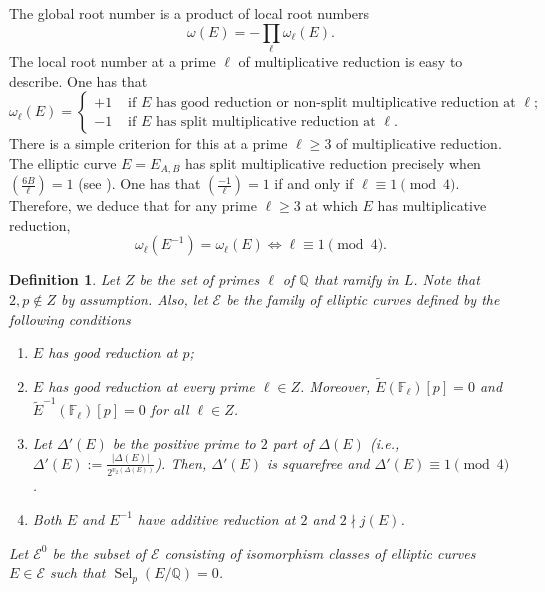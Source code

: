 \documentclass[12pt]{amsart}
\newtheorem{definition}[theorem]{Definition}
\newcommand{\cE}{\mathcal{E}}
\newcommand{\Q}{\mathbb{Q}}
\newcommand{\F}{\mathbb{F}}
\newcommand{\op}[1]{\operatorname{#1}}
\numberwithin{equation}{section}
\begin{document}
\par The global root number is a product of local root numbers 
\[\omega(E)=-\prod_\ell \omega_\ell(E).\] The local root number at a prime $\ell$ of multiplicative reduction is easy to describe. One has that 
\begin{equation}\label{local root number formula}\omega_\ell(E)=\begin{cases}
    +1 & \text{ if }E\text{ has good reduction or non-split multiplicative reduction at }\ell;\\
    -1 & \text{ if }E\text{ has split multiplicative reduction at }\ell.
\end{cases}\end{equation}
There is a simple criterion for this at a prime $\ell \ge 3$ of multiplicative reduction. The elliptic curve $E=E_{A,B}$ has split multiplicative reduction precisely when $\left(\frac{6B}{\ell}\right)=1$ (see \cite[Lemma 10]{Wong}). One has that $\left(\frac{-1}{\ell}\right)=1$ if and only if $\ell \equiv 1 \pmod 4$. Therefore, we deduce that for any prime $\ell \geq 3$ at which $E$ has multiplicative reduction, \begin{equation}\label{omega for mult redn}\omega_\ell(E^{-1})=\omega_\ell(E)\Leftrightarrow \ell \equiv 1 \pmod 4.\end{equation}
\begin{definition}\label{our defn of large family}
    Let $Z$ be the set of primes $\ell$ of $\Q$ that ramify in $L$. Note that $2,p\notin Z$ by assumption. Also, let $\mathcal{E}$ be the family of elliptic curves defined by the following conditions 
\begin{enumerate}
    \item $E$ has good reduction at $p$;
    \item $E$ has good reduction at every prime $\ell\in Z$. Moreover, $\widetilde{E}(\F_\ell)[p]=0$ and  $\widetilde{E}^{-1}(\F_\ell)[p]=0$ for all $\ell \in Z$.
    \item Let $\Delta'(E)$ be the positive prime to $2$ part of $\Delta(E)$ (i.e., $\Delta'(E):=\frac{|\Delta(E)|}{2^{v_2(\Delta(E))}}$). Then, $\Delta'(E)$ is squarefree and $\Delta'(E) \equiv 1\pmod{4}$.
    \item Both $E$ and $E^{-1}$ have additive reduction at $2$ and $2\nmid j(E)$.
\end{enumerate}
Let $\cE^0$ be the subset of $\cE$ consisting of isomorphism classes of elliptic curves $E\in \cE$ such that $\op{Sel}_p(E/\Q)=0$. 
\end{definition}
\end{document}
